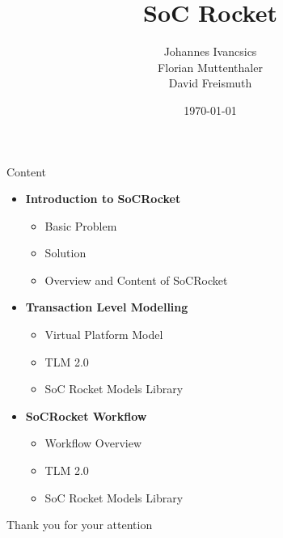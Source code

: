 \documentclass{beamer}
\title[SoC Rocket]{SoC Rocket}
\author{Johannes Ivancsics\\Florian Muttenthaler\\David Freismuth}
\institute[TU Wien]{TU Wien, Vienna, Austria}
\date{\today}
\begin{document}
\begin{frame}
  \titlepage
\end{frame}      


%
%

\begin{frame}{Content}
\begin{itemize}
    \item \textbf{Introduction to SoCRocket}
    \begin{itemize}
        \item Basic Problem
        \item Solution
        \item Overview and Content of SoCRocket
    \end{itemize}
    \item \textbf{Transaction Level Modelling}
    \begin{itemize}
        \item Virtual Platform Model
        \item TLM 2.0
        \item SoC Rocket Models Library
    \end{itemize}
\item \textbf{SoCRocket Workflow}
    \begin{itemize}
        \item Workflow Overview
        \item TLM 2.0
        \item SoC Rocket Models Library
    \end{itemize}
\end{itemize}

\end{frame}





\begin{frame}{}
  \centering\Huge
  Thank you for your attention
\end{frame}

%
%

%
\end{document}
